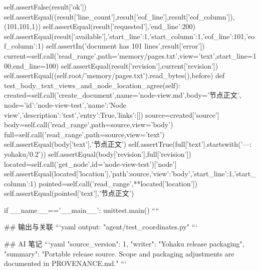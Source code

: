         self.assertFalse(result['ok'])
        self.assertEqual((result['line_count'],result['eof_line'],result['eof_column']),(101,101,1))
        self.assertEqual(result['requested'],{'end_line':200})
        self.assertEqual(result['available'],{'start_line':1,'start_column':1,'eof_line':101,'eof_column':1})
        self.assertIn('document has 101 lines',result['error'])
        current=self.call('read_range',path='memory/pages.txt',view='text',start_line=100,end_line=100)
        self.assertEqual(result['revision'],current['revision'])
        self.assertEqual((self.root/'memory/pages.txt').read_bytes(),before)
    def test_body_text_views_and_node_location_agree(self):
        created=self.call('create_document',name='node-view.md',body='节点正文\n',
                          node={'id':'node-view-test','name':'Node view','description':'test','entry':True,'links':[]})
        source=created['source']
        body=self.call('read_range',path=source,view='body')
        full=self.call('read_range',path=source,view='text')
        self.assertEqual(body['text'],'节点正文\n')
        self.assertTrue(full['text'].startswith('---\nformat: yohaku/0.2'))
        self.assertEqual(body['revision'],full['revision'])
        located=self.call('get_node',id='node-view-test')['node']
        self.assertEqual(located['location'],{'path':source,'view':'body','start_line':1,'start_column':1})
        pointed=self.call('read_range',**located['location'])
        self.assertEqual(pointed['text'],'节点正文\n')


if __name__=='__main__':
    unittest.main()
````

## 输出与关联
```yaml
output: "agent/test_coordinates.py"
```

## AI 笔记
```yaml
{"source_version": 1, "writer": "Yohaku release packaging", "summary": "Portable release source. Scope and packaging adjustments are documented in PROVENANCE.md."}
```
